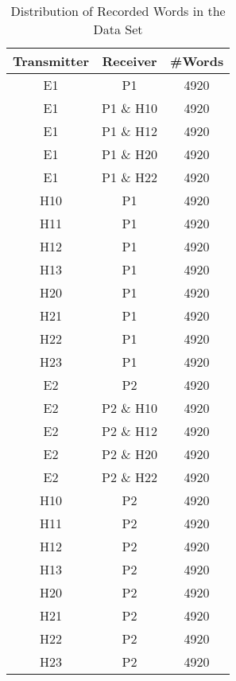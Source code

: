 \documentclass[conference]{IEEEtran}
\begin{document}
  \begin{table}
    \caption{Distribution of Recorded Words in the Data Set}
    \label{tab:RecordingsSummery}
    \centering
    \begin{tabular}{|c c c|} 
      \hline
      Transmitter & Receiver & \#Words \\ [0.5ex] 
      \hline\hline
      E1 & P1 & 4920 \\ %
      \hline
      E1 & P1 \& H10 & 4920 \\
      \hline
      E1 & P1 \& H12 & 4920 \\
      \hline
      E1 & P1 \& H20 & 4920 \\
      \hline
      E1 & P1 \& H22 & 4920 \\
      \hline
      H10 & P1 & 4920 \\
      \hline
      H11 & P1 & 4920 \\
      \hline
      H12 & P1 & 4920 \\
      \hline
      H13 & P1 & 4920 \\
      \hline
      H20 & P1 & 4920 \\
      \hline
      H21 & P1 & 4920 \\
      \hline
      H22 & P1 & 4920 \\
      \hline
      H23 & P1 & 4920 \\
      \hline
      E2 & P2 & 4920 \\ %
      \hline
      E2 & P2 \& H10 & 4920 \\
      \hline
      E2 & P2 \& H12 & 4920 \\
      \hline
      E2 & P2 \& H20 & 4920 \\
      \hline
      E2 & P2 \& H22 & 4920 \\
      \hline
      H10 & P2 & 4920 \\
      \hline
      H11 & P2 & 4920 \\
      \hline
      H12 & P2 & 4920 \\
      \hline
      H13 & P2 & 4920 \\
      \hline
      H20 & P2 & 4920 \\
      \hline
      H21 & P2 & 4920 \\
      \hline
      H22 & P2 & 4920 \\
      \hline
      H23 & P2 & 4920 \\
      \hline
    \end{tabular}
  \end{table}
  
\end{document}
